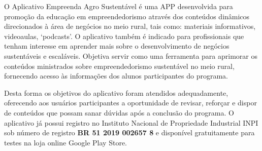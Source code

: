 O Aplicativo Empreenda Agro Sustentável é uma APP desenvolvida para promoção da educação em empreendedorismo através dos conteúdos dinâmicos direcionados à área de negócios no meio rural, tais como: materiais informativos, videoaulas, ‘podcasts’. O aplicativo também é indicado para profissionais que tenham interesse em aprender mais sobre o desenvolvimento de negócios sustentáveis e escaláveis. Objetiva servir como uma ferramenta para aprimorar os conteúdos ministrados sobre empreendedorismo sustentável no meio rural, fornecendo acesso às informações dos alunos participantes do programa. 

Desta forma os objetivos do aplicativo foram atendidos adequadamente, oferecendo aos usuários participantes a oportunidade de revisar, reforçar e dispor de conteúdos que possam sanar dúvidas após a conclusão do programa. O aplicativo já possui registro no Instituto Nacional de Propriedade Industrial INPI sob número de registro \textbf{BR 51 2019 002657 8} e disponível gratuitamente para testes na loja online Google Play Store.

